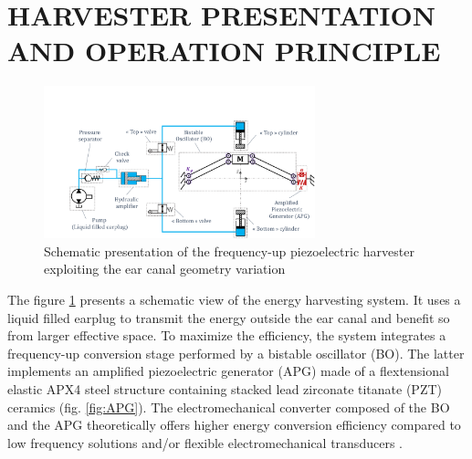 \documentclass[3p,twocolumn,preprint]{elsarticle}
\begin{document}
\section{HARVESTER PRESENTATION AND OPERATION \mbox{PRINCIPLE}}
\label{sec:HARVESTER PRESENTATION AND OPERATION PRINCIPLE}
\begin{figure}[!htbp]
	\centering
	\captionsetup{justification=centering}
	\includegraphics[trim={3.2cm 0cm 0cm 4.3cm},clip, width=0.7\textwidth]{figures/system_presentation.pdf}
	\caption{Schematic presentation of the frequency-up piezoelectric harvester exploiting the ear canal geometry variation} 
	\label{fig:system_presentation}
\end{figure}
The figure \ref{fig:system_presentation} presents a schematic view of the energy harvesting system. It uses a liquid filled earplug to transmit the energy outside the ear canal and benefit so from larger effective space. To maximize the efficiency, the system integrates a frequency-up conversion stage performed by a bistable oscillator (BO). The latter implements an amplified piezoelectric generator (APG) made of a flextensional elastic APX4 steel structure containing stacked lead zirconate titanate (PZT) ceramics (fig. \ref{fig:APG}). The electromechanical converter composed of the BO and the APG theoretically offers higher energy conversion efficiency compared to low frequency solutions and/or flexible electromechanical transducers \cite{Guo2019,Peng2021,Kulah2008}.
\end{document}
